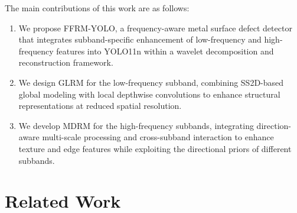 \documentclass[pdflatex,sn-nature]{sn-jnl}
\begin{document}
    The main contributions of this work are as follows:
    
    \begin{enumerate}
    \item We propose FFRM-YOLO, a frequency-aware metal surface defect detector that integrates subband-specific enhancement of low-frequency and high-frequency features into YOLO11n within a wavelet decomposition and reconstruction framework.
    
    \item We design GLRM for the low-frequency subband, combining SS2D-based global modeling with local depthwise convolutions to enhance structural representations at reduced spatial resolution.
    
    \item We develop MDRM for the high-frequency subbands, integrating direction-aware multi-scale processing and cross-subband interaction to enhance texture and edge features while exploiting the directional priors of different subbands.
    \end{enumerate}

\section{Related Work}\label{sec:related}
\end{document}
